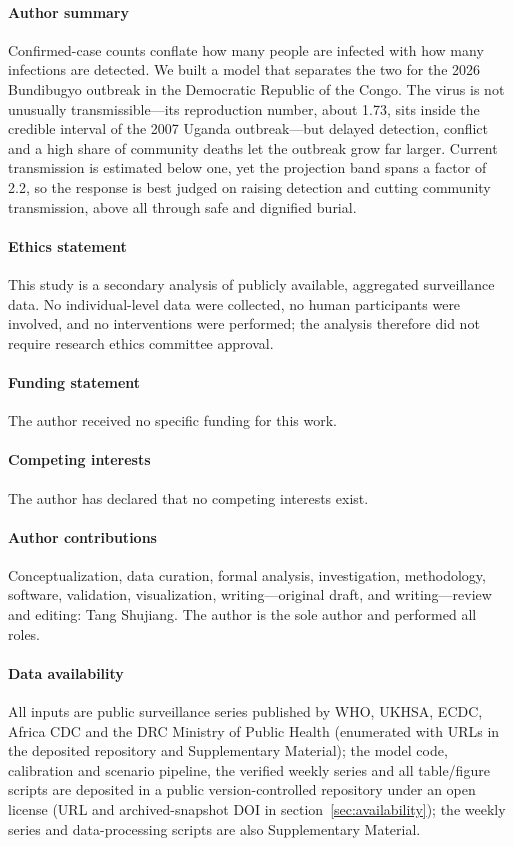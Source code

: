 \documentclass[preprint,12pt,numbers]{elsarticle}
\begin{document}
\begin{frontmatter}
\paragraph*{Author summary}
Confirmed-case counts conflate how many people are infected with how
many infections are detected. We built a model that separates the two
for the 2026 Bundibugyo outbreak in the Democratic Republic of the
Congo. The virus is not unusually transmissible---its reproduction
number, about 1.73, sits inside the credible interval of the 2007
Uganda outbreak---but delayed detection, conflict and a high share of
community deaths let the outbreak grow far larger. Current transmission
is estimated below one, yet the projection band spans a factor of 2.2,
so the response is best judged on raising detection and cutting
community transmission, above all through safe and dignified burial.
\paragraph*{Ethics statement}
This study is a secondary analysis of publicly available, aggregated
surveillance data. No individual-level data were collected, no human
participants were involved, and no interventions were performed; the
analysis therefore did not require research ethics committee approval.

\paragraph*{Funding statement}
The author received no specific funding for this work.

\paragraph*{Competing interests}
The author has declared that no competing interests exist.

\paragraph*{Author contributions}
Conceptualization, data curation, formal analysis, investigation,
methodology, software, validation, visualization, writing---original
draft, and writing---review and editing: Tang Shujiang. The author is the
sole author and performed all roles.

\paragraph*{Data availability}
All inputs are public surveillance series published by WHO, UKHSA, ECDC, Africa CDC and the DRC Ministry of Public Health (enumerated with URLs in the deposited repository and Supplementary Material);
the model code, calibration and scenario pipeline, the verified weekly
series and all table/figure scripts are deposited in a public
version-controlled repository under an open license (URL and
archived-snapshot DOI in section~\ref{sec:availability}); the weekly
series and data-processing scripts are also Supplementary Material.
\end{frontmatter}
\end{document}
